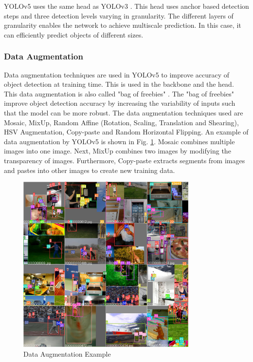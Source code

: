 \documentclass[12pt,a4paper,fleqn]{report}
\begin{document}
YOLOv5 uses the same head as YOLOv3 \cite{yolov3:2018}.
This head uses anchor based detection steps and three detection levels varying in granularity.
The different layers of granularity enables the network to achieve multiscale prediction.
In this case, it can efficiently predict objects of different sizes.


\subsubsection{Data Augmentation}
Data augmentation techniques are used in YOLOv5 to improve accuracy of object
detection at training time.
This is used in the backbone and the head.
This data augmentation is also called "bag of freebies" \cite{yolov4:2020}.
The "bag of freebies" improve object detection accuracy by increasing the variability of inputs
such that the model can be more robust.
The data augmentation techniques used are Mosaic, MixUp, Random Affine (Rotation, Scaling,
Translation and Shearing), HSV Augmentation, Copy-paste and Random Horizontal Flipping.
An example of data augmentation by YOLOv5 is shown in Fig. \ref{fig:data_augmentation}.
Mosaic combines multiple images into one image.
Next, MixUp combines two images by modifying the transparency of images.
Furthermore, Copy-paste extracts segments from images and pastes into other images to create new
training data.

\begin{figure}[htbp]
    \begin{center}
        \includegraphics[width=0.8\textwidth]{figures/augmentation_ex.jpg}
    \end{center}
    \caption{Data Augmentation Example}
    \label{fig:data_augmentation}
\end{figure}
\end{document}
